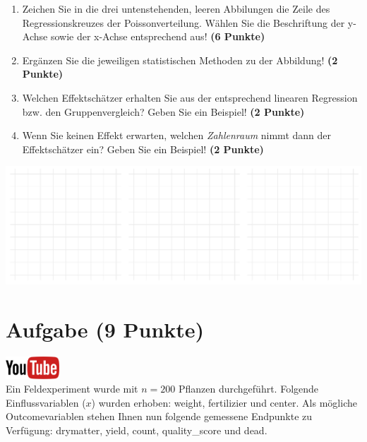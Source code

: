 \documentclass[a4paper, 10pt]{scrartcl}\usepackage[]{graphicx}\usepackage[]{xcolor}
\makeatletter
\def\maxwidth{ %
  \ifdim\Gin@nat@width>\linewidth
    \linewidth
  \else
    \Gin@nat@width
  \fi
}
\makeatother
\begin{document}
\begin{enumerate}
\item Zeichen Sie in die drei untenstehenden, leeren Abbilungen die Zeile des
  Regressionskreuzes der Poissonverteilung. W{\"a}hlen Sie die Beschriftung der
  y-Achse sowie der x-Achse entsprechend aus! \textbf{(6 Punkte)}
\item Erg{\"a}nzen Sie die jeweiligen statistischen Methoden zu der Abbildung! \textbf{(2 Punkte)}
\item Welchen Effektsch{\"a}tzer erhalten Sie aus der entsprechend linearen
  Regression bzw. den Gruppenvergleich? Geben Sie ein Beispiel! \textbf{(2 Punkte)}
\item Wenn Sie keinen Effekt erwarten, welchen \textit{Zahlenraum} nimmt dann
  der Effektsch{\"a}tzer ein? Geben Sie ein Beispiel! \textbf{(2 Punkte)}
\end{enumerate}



{\centering \includegraphics[width=\maxwidth]{img/regression-01-1} 

}



 
\clearpage

\section{Aufgabe \hfill (9 Punkte)}

\hfill\href{https://youtu.be/AwQEcQWLFCw}{\includegraphics[width =
  2cm]{img/youtube}}\\[1Ex]



Ein Feldexperiment wurde mit $n = 200$ Pflanzen durchgef{\"u}hrt. Folgende
Einflussvariablen ($x$) wurden erhoben: weight, fertilizier und center. Als m{\"o}gliche Outcomevariablen stehen Ihnen nun
folgende gemessene Endpunkte zu Verf{\"u}gung: drymatter, yield, count, quality\_score und dead.
\end{document}
